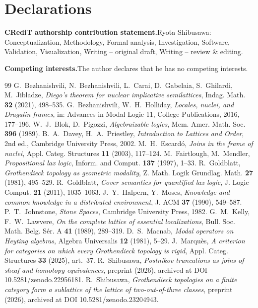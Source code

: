 \documentclass[11pt]{amsart}
\theoremstyle{definition}
\begin{document}
\section*{Declarations}
\noindent\textbf{CRediT authorship contribution statement.}\quad Ryota Shibusawa:
Conceptualization, Methodology, Formal analysis, Investigation, Software,
Validation, Visualization, Writing -- original draft, Writing -- review \& editing.

\noindent\textbf{Competing interests.}\quad The author declares that he has no
competing interests.

\begin{thebibliography}{99}
 G.~Bezhanishvili, N.~Bezhanishvili, L.~Carai, D.~Gabelaia,
S.~Ghilardi, M.~Jibladze, \emph{Diego's theorem for nuclear implicative
semilattices}, Indag. Math. \textbf{32} (2021), 498--535.
 G.~Bezhanishvili, W.~H.~Holliday, \emph{Locales, nuclei, and
Dragalin frames}, in: Advances in Modal Logic 11, College Publications, 2016,
177--196.
 W.~J.~Blok, D.~Pigozzi, \emph{Algebraizable logics}, Mem. Amer.
Math. Soc. \textbf{396} (1989).
 B.~A.~Davey, H.~A.~Priestley, \emph{Introduction to Lattices and
Order}, 2nd ed., Cambridge University Press, 2002.
 M.~H.~Escard\'o, \emph{Joins in the frame of nuclei}, Appl.
Categ. Structures \textbf{11} (2003), 117--124.
 M.~Fairtlough, M.~Mendler, \emph{Propositional lax logic}, Inform.
and Comput. \textbf{137} (1997), 1--33.
 R.~Goldblatt, \emph{Grothendieck topology as geometric
modality}, Z. Math. Logik Grundlag. Math. \textbf{27} (1981), 495--529.
 R.~Goldblatt, \emph{Cover semantics for quantified lax
logic}, J. Logic Comput. \textbf{21} (2011), 1035--1063.
 J.~Y.~Halpern, Y.~Moses, \emph{Knowledge and common knowledge in a
distributed environment}, J. ACM \textbf{37} (1990), 549--587.
 P.~T.~Johnstone, \emph{Stone Spaces}, Cambridge University
Press, 1982.
 G.~M.~Kelly, F.~W.~Lawvere, \emph{On the complete lattice of
essential localizations}, Bull. Soc. Math. Belg. S\'er. A \textbf{41} (1989),
289--319.
 D.~S.~Macnab, \emph{Modal operators on Heyting algebras},
Algebra Universalis \textbf{12} (1981), 5--29.
 J.~Marqu\`es, \emph{A criterion for categories on which
every Grothendieck topology is rigid}, Appl. Categ. Structures \textbf{33}
(2025), art.\ 37.
 R.~Shibusawa, \emph{Postnikov truncations as joins of sheaf
and homotopy equivalences}, preprint (2026), archived at DOI 10.5281/zenodo.22956181.
 R.~Shibusawa, \emph{Grothendieck topologies on a finite
category form a sublattice of the lattice of two-out-of-three classes},
preprint (2026), archived at DOI 10.5281/zenodo.23204943.
\end{thebibliography}
\end{document}
